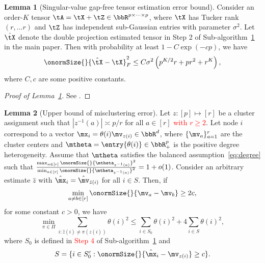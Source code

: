\documentclass[lettersize,onecolumn,journal]{IEEEtran}
\theoremstyle{definition}
\newtheorem{lem}{Lemma}
\theoremstyle{definition}
\newcommand{\of}[1]{\left(#1\right)}
\begin{document}
\begin{lem}[Singular-value gap-free tensor estimation error bound]\label{lem:two-step_esterror}Consider an order-$K$ tensor $\tA = \tX + \tZ \in \bbR^{p \times \cdots \times p}$, where $\tX$ has Tucker rank $(r,...r)$ and $\tZ$ has independent sub-Gaussian entries with parameter $\sigma^2$. Let $\hat \tX$ denote the double projection estimated tensor in Step 2 of Sub-algorithm~\hyperref[alg:main]{1} in the main paper. Then with probability at least $1 - C \exp\of{- cp }$, we have
\begin{align}
    \onormSize{}{\hat \tX - \tX}_F^2 \leq C \sigma^2 \of{ p^{K/2}r + pr^2 + r^K },
\end{align}
where $C, c$ are some positive constants.
\end{lem}

\begin{proof}[Proof of Lemma~\ref{lem:two-step_esterror}]
See \citet[Proposition 1]{han2020exact}.
\end{proof}

\begin{lem}[Upper bound of misclustering error]\label{lem:upper_mis} Let $z: [p] \mapsto [r]$ be a cluster assignment such that $|z^{-1}(a)| \asymp p/r$ for all $a \in [r]$ \textcolor{red}{with $r \geq 2$}. Let node $i$ correspond to a vector $\mx_i  = \theta(i) \mv_{z(i)} \in \bbR^d$, where $\{\mv_a\}_{a = 1}^r$ are the cluster centers and $\mtheta = \entry{\theta(i)} \in \bbR^p_+$ is the positive degree heterogeneity.  Assume that  $\mtheta$ satisfies the balanced assumption~\eqref{eq:degree} such that ${\max_{a \in [r]} \onormSize{}{\mtheta_{z^{-1}(a)}}^2 \over \min_{a \in [r]} \onormSize{}{\mtheta_{z^{-1}(a)}}^2 }= 1 + o(1)$. Consider an arbitrary estimate $\hat z$ with $\hat \mx_i = \hat \mv_{\hat z(i)}$ for all $ i \in S$. Then, if
\begin{equation}\label{eq:upper_mis_cond}
    \min_{a \neq b \in [r]} \onormSize{}{\mv_a - \mv_b} \geq 2c,
\end{equation}
 for some constant $c >0$, we have 
\begin{equation}
    \min_{\pi \in \Pi} \sum_{i : \hat z(i) \neq \pi(z(i))} \theta(i)^2 \leq \sum_{i \in S_0} \theta(i)^2 + 4 \sum_{i \in S} \theta(i)^2,
\end{equation}
where $S_0$ is defined in \textcolor{red}{Step 4} of Sub-algorithm~\hyperref[alg:main]{1} and
\begin{equation}
   S = \{i \in S_0^c: \onormSize{}{\hat \mx_i - \mv_{z(i)} } \geq c \}.
\end{equation}

\end{lem}
\end{document}
